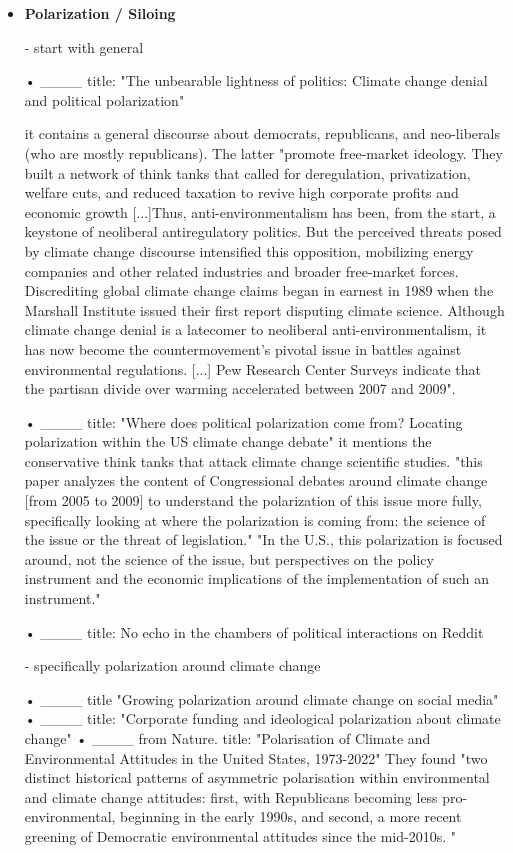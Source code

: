 \begin{itemize}
\item \textbf{Polarization / Siloing}

- start with general

• ____ title: "The unbearable lightness of politics: Climate change denial and political polarization"

it contains a general discourse about democrats, republicans, and neo-liberals (who are mostly republicans). The latter "promote free-market ideology. They built a network of think tanks that called for deregulation, privatization, welfare cuts, and reduced taxation to revive high corporate profits and economic growth [...]Thus, anti-environmentalism has been, from the start, a keystone of neoliberal antiregulatory politics. But the perceived threats posed by climate change discourse intensified this opposition, mobilizing energy companies and other related industries and broader free-market forces. Discrediting global climate change claims began in earnest in 1989 when the Marshall Institute issued their first report disputing climate
science. Although climate change denial is a latecomer to neoliberal anti-environmentalism, it has now become the countermovement’s pivotal issue in battles against environmental regulations. [...] Pew Research Center Surveys indicate that the partisan divide over warming accelerated between 2007 and 2009". 

• ____ title: "Where does political polarization come from? Locating polarization within the US climate change debate" 
it mentions the conservative think tanks that attack climate change scientific studies. "this paper analyzes the content of
Congressional debates around climate change [from 2005 to 2009] to understand the polarization of this issue more fully, specifically looking at where the polarization is coming from: the science of the issue or the threat of legislation." 
"In the U.S., this polarization is focused around, not the science of the issue, but perspectives on the policy instrument and the economic implications of the implementation of such an instrument."



• ____ title: No echo in the chambers of political interactions on Reddit



- specifically polarization around climate change

• ____ title "Growing polarization around climate change on social media" 
• ____ title: "Corporate funding and ideological polarization about climate change"
• ____ from Nature. title: "Polarisation of Climate and Environmental Attitudes in the United States, 1973-2022" They found "two distinct historical patterns of asymmetric polarisation within environmental and climate change attitudes: first, with Republicans becoming less pro-environmental, beginning in the early 1990s, and second, a more recent greening of Democratic environmental attitudes since the mid-2010s. "





\end{itemize}
